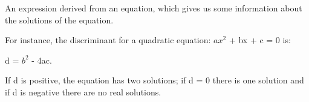 An expression derived from an equation, which gives us some
information about the solutions of the equation.\par

For instance, the discriminant for a quadratic equation: $ax^{2}$  + bx + c = 0 is:\par

d = $b^{2}$  - 4ac.\par

If d is positive, the equation has two solutions;
if d = 0 there is one solution and if d is negative
there are no real solutions.